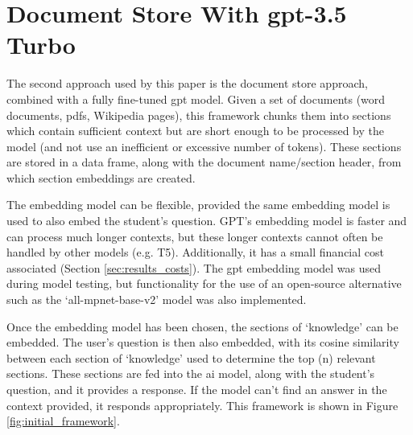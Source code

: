 


\section{Document Store With \acrshort{gpt}-3.5 Turbo}\label{methodology_gpt}
The second approach used by this paper is the document store approach, combined with a fully fine-tuned \acrshort{gpt} model. Given a set of documents (word documents, \acrshort{pdf}s, Wikipedia pages), this framework chunks them into sections which contain sufficient context but are short enough to be processed by the model (and not use an inefficient or excessive number of tokens). These sections are stored in a data frame, along with the document name/section header, from which section embeddings are created.

The embedding model can be flexible, provided the same embedding model is used to also embed the student's question. GPT's embedding model is faster and can process much longer contexts, but these longer contexts cannot often be handled by other models (e.g. T5). Additionally, it has a small financial cost associated (Section \ref{sec:results_costs}). The \acrshort{gpt} embedding model was used during model testing, but functionality for the use of an open-source alternative such as the `all-mpnet-base-v2' model \citep{huggingface_tokeniser_model} was also implemented.

Once the embedding model has been chosen, the sections of `knowledge' can be embedded. The user's question is then also embedded, with its cosine similarity between each section of `knowledge' used to determine the top (n) relevant sections. These sections are fed into the \acrshort{ai} model, along with the student's question, and it provides a response. If the model can't find an answer in the context provided, it responds appropriately. This framework is shown in Figure \ref{fig:initial_framework}.

